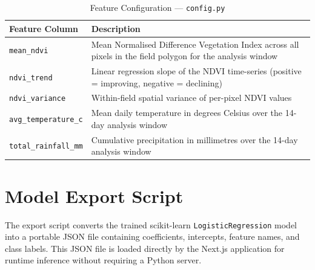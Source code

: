 \documentclass[12pt,a4paper]{report}
\begin{document}
\begin{table}[H]
  \centering
  \caption{Feature Configuration — \texttt{config.py}}
  \label{tab:featureconfig}
  \begin{tabularx}{\textwidth}{l X}
    \toprule
    \textbf{Feature Column} & \textbf{Description} \\
    \midrule
    \texttt{mean\_ndvi} & Mean Normalised Difference Vegetation Index across all pixels in the field polygon for the analysis window \\
    \texttt{ndvi\_trend} & Linear regression slope of the NDVI time-series (positive = improving, negative = declining) \\
    \texttt{ndvi\_variance} & Within-field spatial variance of per-pixel NDVI values \\
    \texttt{avg\_temperature\_c} & Mean daily temperature in degrees Celsius over the 14-day analysis window \\
    \texttt{total\_rainfall\_mm} & Cumulative precipitation in millimetres over the 14-day analysis window \\
    \bottomrule
  \end{tabularx}
\end{table}

\chapter{Model Export Script}
\label{app:export}

The export script converts the trained scikit-learn \texttt{LogisticRegression} model into a portable JSON file containing coefficients, intercepts, feature names, and class labels. This JSON file is loaded directly by the Next.js application for runtime inference without requiring a Python server.
\end{document}
